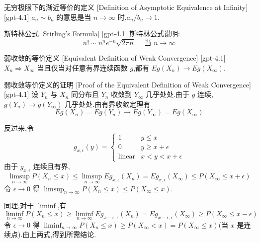 \documentclass[UTF8]{ctexart}
\begin{document}
    
    
    \begin{dfn}
        {无穷极限下的渐近等价的定义}
        [Definition of Asymptotic Equivalence at Infinity]
        [gpt-4.1]
        $a_{n} \sim b_{n}$ 的意思是当 $n \to \infty$ 时,$a_{n}/b_{n} \to 1$.
    \end{dfn}
    
    
    
    \begin{thm}
        {斯特林公式}
        [Stirling's Formula]
        [gpt-4.1]
        斯特林公式说明:
\[
n! \sim n^{n} e^{-n} \sqrt{2\pi n} \quad \text{ 当 } n \to \infty
\]

    \end{thm}
    
    
    
    \begin{thm}
        {弱收敛的等价定义}
        [Equivalent Definition of Weak Convergence]
        [gpt-4.1]
        $X_{n} \Rightarrow X_{\infty}$ 当且仅当对任意有界连续函数 $g$,都有 $E g(X_{n}) \to E g(X_{\infty})$.
    \end{thm}
    
    
    
    \begin{prf}
        {弱收敛等价定义的证明}
        [Proof of the Equivalent Definition of Weak Convergence]
        [gpt-4.1]
        设 $Y_{n}$ 与 $X_{n}$ 同分布且 $Y_{n}$ 收敛到 $Y_{\infty}$ 几乎处处.由于 $g$ 连续,$g(Y_{n}) \to g(Y_{\infty})$ 几乎处处.由有界收敛定理有
\[
E g(X_{n}) = E g(Y_{n}) \to E g(Y_{\infty}) = E g(X_{\infty})
\]

反过来,令
\[
g_{x, \epsilon}(y) = 
\begin{cases}
1 & y \leq x \\
0 & y \geq x + \epsilon \\
\text{linear} & x < y < x + \epsilon
\end{cases}
\]
由于 $g_{x, \epsilon}$ 连续且有界,
\[
\limsup_{n \to \infty} P(X_{n} \leq x) \leq \limsup_{n \to \infty} E g_{x, \epsilon}(X_{n}) = E g_{x, \epsilon}(X_{\infty}) \leq P(X_{\infty} \leq x + \epsilon)
\]
令 $\epsilon \to 0$ 得 $\limsup_{n \to \infty} P(X_{n} \leq x) \leq P(X_{\infty} \leq x)$.

同理,对于 $\liminf$,有
\[
\liminf_{n \to \infty} P(X_{n} \leq x) \geq \liminf_{n \to \infty} E g_{x - \epsilon, \epsilon}(X_{n}) = E g_{x - \epsilon, \epsilon}(X_{\infty}) \geq P(X_{\infty} \leq x - \epsilon)
\]
令 $\epsilon \to 0$ 得 $\liminf_{n \to \infty} P(X_{n} \leq x) \geq P(X_{\infty} < x) = P(X_{\infty} \leq x)$(当 $x$ 是连续点).由上两式,得到所需结论.
    \end{prf}
    
\end{document}
